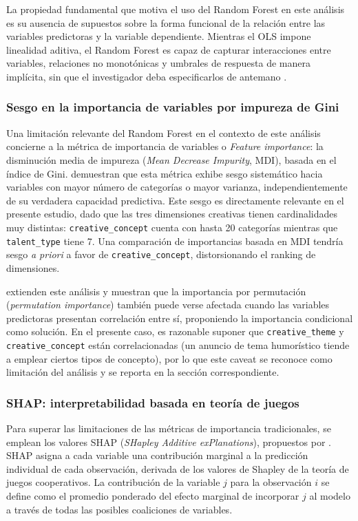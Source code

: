 \documentclass[12pt, a4paper]{report}
\begin{document}
La propiedad fundamental que motiva el uso del Random Forest en este análisis es su
ausencia de supuestos sobre la forma funcional de la relación entre las variables
predictoras y la variable dependiente. Mientras el OLS impone linealidad aditiva,
el Random Forest es capaz de capturar interacciones entre variables, relaciones no
monotónicas y umbrales de respuesta de manera implícita, sin que el investigador
deba especificarlos de antemano \citep[Cap.~15]{hastie2009}.

\subsubsection*{Sesgo en la importancia de variables por impureza de Gini}

Una limitación relevante del Random Forest en el contexto de este análisis concierne
a la métrica de importancia de variables o \textit{Feature importance}: la disminución media de impureza
(\textit{Mean Decrease Impurity}, MDI), basada en el índice de Gini. \citet{strobl2007}
demuestran que esta métrica exhibe sesgo sistemático hacia variables con mayor número
de categorías o mayor varianza, independientemente de su verdadera capacidad predictiva.
Este sesgo es directamente relevante en el presente estudio, dado que las tres dimensiones
creativas tienen cardinalidades muy distintas: \texttt{creative\_concept} cuenta con
hasta 20 categorías mientras que \texttt{talent\_type} tiene 7. Una comparación de
importancias basada en MDI tendría sesgo \textit{a priori} a favor de \texttt{creative\_concept},
distorsionando el ranking de dimensiones.

\citet{strobl2008} extienden este análisis y muestran que la importancia por permutación
(\textit{permutation importance}) también puede verse afectada cuando las variables
predictoras presentan correlación entre sí, proponiendo la importancia condicional
como solución. En el presente caso, es razonable suponer que \texttt{creative\_theme}
y \texttt{creative\_concept} están correlacionadas (un anuncio de tema humorístico
tiende a emplear ciertos tipos de concepto), por lo que este caveat se reconoce
como limitación del análisis y se reporta en la sección correspondiente.

\subsubsection*{SHAP: interpretabilidad basada en teoría de juegos}

Para superar las limitaciones de las métricas de importancia tradicionales,
se emplean los valores SHAP (\textit{SHapley Additive exPlanations}), propuestos
por \citet{lundberg2017}. SHAP asigna a cada variable una contribución marginal
a la predicción individual de cada observación, derivada de los valores de Shapley
de la teoría de juegos cooperativos. La contribución de la variable $j$ para la
observación $i$ se define como el promedio ponderado del efecto marginal de incorporar
$j$ al modelo a través de todas las posibles coaliciones de variables.
\end{document}
